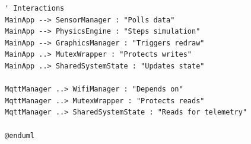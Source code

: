 \begin{lstlisting}[language={}, breaklines=true]
' Interactions
MainApp --> SensorManager : "Polls data"
MainApp --> PhysicsEngine : "Steps simulation"
MainApp --> GraphicsManager : "Triggers redraw"
MainApp ..> MutexWrapper : "Protects writes"
MainApp ..> SharedSystemState : "Updates state"

MqttManager ..> WifiManager : "Depends on"
MqttManager ..> MutexWrapper : "Protects reads"
MqttManager ..> SharedSystemState : "Reads for telemetry"

@enduml
\end{lstlisting}
